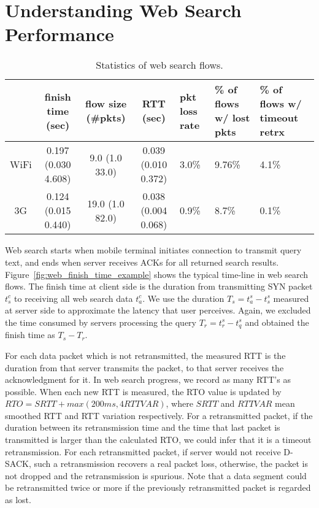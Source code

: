 
\section{Understanding Web Search Performance}
\label{sec:web_search}

\begin{table*}[th]
\caption{Statistics of web search flows.}
\label{tab:web_stats}
\centering
\renewcommand{\arraystretch}{1.0}
\begin{tabular}{c|c|c|c|C{1.2cm}|C{1.85cm}|C{2.1cm}}
	\hline
	& {finish time (sec)} & {flow size (\#pkts)} & {RTT (sec)} & pkt loss rate & \% of flows w/ lost pkts & \% of flows w/ timeout retrx \\
	\hline
	WiFi & 0.197 (0.030 4.608) & 9.0 (1.0 33.0) & 0.039 (0.010 0.372) & 3.0\% & 9.76\% & 4.1\% \\
	\hline
	3G & 0.124 (0.015 0.440) & 19.0 (1.0 82.0) & 0.038 (0.004 0.068) & 0.9\% & 8.7\% & 0.1\% \\
	\hline
\end{tabular}
\end{table*}

Web search starts when mobile terminal initiates connection to transmit query text, and ends when server receives ACKs for all returned search results. Figure~\ref{fig:web_finish_time_example} shows the typical time-line in web search flows. The finish time at client side is the duration from transmitting SYN packet $t^c_s$ to receiving all web search data $t^c_a$. We use the duration $T_s=t^s_a - t^s_s$ measured at server side to approximate the latency that user perceives. Again, we excluded the time consumed by servers processing the query $T_r=t^s_r - t^s_q$ and obtained the finish time as $T_s-T_r$.

For each data packet which is not retransmitted, the measured RTT is the duration from that server transmits the packet, to that server receives the acknowledgment for it. In web search progress, we record as many RTT's as possible. When each new RTT is measured, the RTO value is updated by $RTO = SRTT + max(200ms, 4 RTTVAR)$, where $SRTT$ and $RTTVAR$ mean smoothed RTT and RTT variation respectively. For a retransmitted packet, if the duration between its retransmission time and the time that last packet is transmitted is larger than the calculated RTO, we could infer that it is a timeout retransmission. For each retransmitted packet, if server would not receive D-SACK, such a retransmission recovers a real packet loss, otherwise, the packet is not dropped and the retransmission is spurious. Note that a data segment could be retransmitted twice or more if the previously retransmitted packet is regarded as lost.


